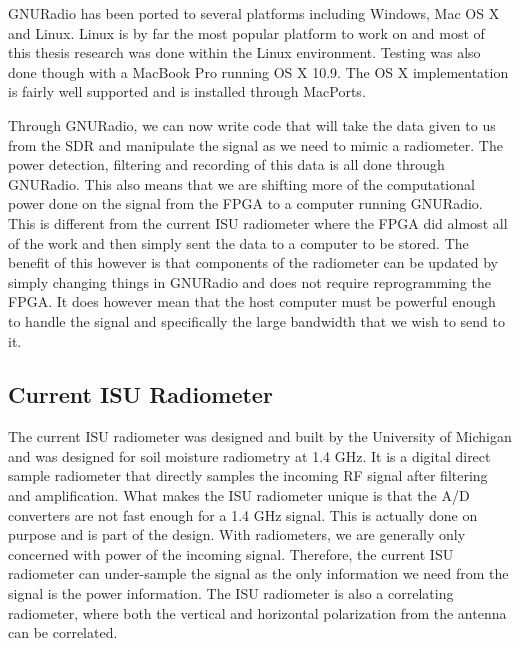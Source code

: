 GNURadio has been ported to several platforms including Windows, Mac OS X and Linux.  Linux is by far the most popular platform to work on and most of this thesis research was done within the Linux environment.  Testing was also done though with a MacBook Pro running OS X 10.9.  The OS X implementation is fairly well supported and is installed through MacPorts.  

Through GNURadio, we can now write code that will take the data given to us from the SDR and manipulate the signal as we need to mimic a radiometer.  The power detection, filtering and recording of this data is all done through GNURadio.  This also means that we are shifting more of the computational power done on the signal from the FPGA to a computer running GNURadio.  This is different from the current ISU radiometer where the FPGA did almost all of the work and then simply sent the data to a computer to be stored.  The benefit of this however is that components of the radiometer can be updated by simply changing things in GNURadio and does not require reprogramming the FPGA.  It does however mean that the host computer must be powerful enough to handle the signal and specifically the large bandwidth that we wish to send to it.  

\subsection{Current ISU Radiometer}
The current ISU radiometer was designed and built by the University of Michigan and was designed for soil moisture radiometry at 1.4 GHz.  It is a digital direct sample radiometer that directly samples the incoming RF signal after filtering and amplification.  What makes the ISU radiometer unique is that the A/D converters are not fast enough for a 1.4 GHz signal.  This is actually done on purpose and is part of the design.  With radiometers, we are generally only concerned with power of the incoming signal.  Therefore, the current ISU radiometer can under-sample the signal as the only information we need from the signal is the power information.  The ISU radiometer is also a correlating radiometer, where both the vertical and horizontal polarization from the antenna can be correlated.  

